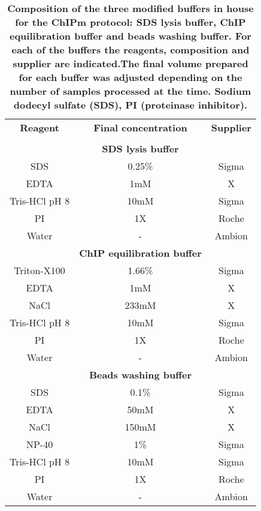 \begin{table}[htbp]
\setlength{\tabcolsep}{20pt}
\renewcommand{\arraystretch}{1.5}
\begin{tabular}{@{} c c c}
\toprule
\textbf{Reagent} & \textbf{Final concentration} & \textbf{Supplier} \\
 & & \\
\bottomrule
 & \textbf{SDS lysis buffer} & \\
\midrule
\midrule
SDS & 0.25\% & Sigma \\	
EDTA	& 1mM & X \\
Tris-HCl pH 8 & 10mM & Sigma \\
PI & 1X & Roche \\
Water & - & Ambion \\
\bottomrule
 & \textbf{ChIP equilibration buffer}  & \\
\midrule
\midrule
Triton-X100 & 1.66\% & Sigma	\\
EDTA	& 1mM & X \\
NaCl	& 233mM & X \\
Tris-HCl pH 8 & 10mM & Sigma \\
PI & 1X & Roche \\
Water & - & Ambion \\
\bottomrule
 & \textbf{Beads washing buffer} & \\
\midrule
\midrule
SDS & 0.1\% & Sigma	\\
EDTA	& 50mM & X \\
NaCl & 150mM & X \\
NP-40 & 1\% & Sigma \\
Tris-HCl pH 8 & 10mM & Sigma \\
PI & 1X & Roche \\
Water & - & Ambion \\
\bottomrule
\end{tabular}
\medskip %
\caption[ChIPm buffers modified from Schmidl \textit{et. al}, 2015]{\textbf{Composition of the three modified buffers in house for the ChIPm protocol: SDS lysis buffer, ChIP equilibration buffer and beads washing buffer. For each of the buffers the reagents, composition and supplier are indicated.The final volume prepared for each buffer was adjusted depending on the number of samples processed at the time. Sodium dodecyl sulfate (SDS), PI (proteinase inhibitor).}}
\label{tab:ChIPm_buffers}
\end{table}
\bigskip %

